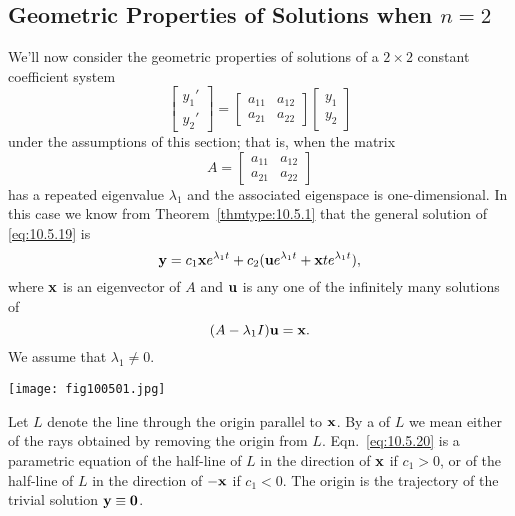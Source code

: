 \documentclass{ximera}
\begin{document}
\subsection*{Geometric Properties of Solutions when  $n=2$}
We'll now  consider the geometric properties of solutions of a
$2\times 2$ constant coefficient system
\begin{equation} \label{eq:10.5.19}
\begin{bmatrix}y_1'\\y_2'\end{bmatrix}=\begin{bmatrix}a_{11}&a_{12}\\a_{21}&a_{22}
\end{bmatrix}\begin{bmatrix}y_1\\y_2\end{bmatrix}
\end{equation}
under the assumptions of this section; that is, when the matrix
$$
A=\begin{bmatrix}a_{11}&a_{12}\\a_{21}&a_{22}
\end{bmatrix}
$$
has a repeated eigenvalue $\lambda_1$ and the associated eigenspace is
one-dimensional. In this case we know from Theorem~\ref{thmtype:10.5.1}
that the general solution of \eqref{eq:10.5.19} is
\begin{equation} \label{eq:10.5.20}
{\bf y}=c_1{\bf x}e^{\lambda_1t}+c_2({\bf u}e^{\lambda_1t}+{\bf
x}te^{\lambda_1t}),
\end{equation}
where ${\bf x}$ is an eigenvector of $A$ and ${\bf u}$ is any one of
the infinitely many solutions of
\begin{equation} \label{eq:10.5.21}
(A-\lambda_1I){\bf u}={\bf x}.
\end{equation}
We assume that $\lambda_1\neq0$.

\begin{image}
 \texttt{[image: fig100501.jpg]} 
\end{image}


Let $L$ denote the line through the origin parallel to ${\bf x}$. By a
 of $L$ we mean either of the rays obtained by
removing the origin from $L$. Eqn.~\eqref{eq:10.5.20} is a parametric
equation of the half-line of $L$ in the direction of ${\bf x}$ if
$c_1>0$, or of the half-line of $L$ in the direction of $-{\bf x}$ if
$c_1<0$. The origin is the trajectory of the trivial solution ${\bf
y}\equiv{\bf 0}$.
\end{document}
